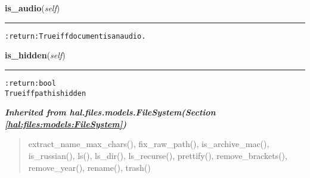     \label{hal:files:models:Document:is_audio}

    \vspace{0.5ex}

\hspace{.8\funcindent}\begin{boxedminipage}{\funcwidth}

    \raggedright \textbf{is\_audio}(\textit{self})

    \vspace{-1.5ex}

    \rule{\textwidth}{0.5\fboxrule}
\setlength{\parskip}{2ex}
\begin{alltt}

:return: True iff document is an audio.
\end{alltt}

\setlength{\parskip}{1ex}
    \end{boxedminipage}

    \label{hal:files:models:Document:is_hidden}

    \vspace{0.5ex}

\hspace{.8\funcindent}\begin{boxedminipage}{\funcwidth}

    \raggedright \textbf{is\_hidden}(\textit{self})

    \vspace{-1.5ex}

    \rule{\textwidth}{0.5\fboxrule}
\setlength{\parskip}{2ex}
\begin{alltt}

:return: bool
    True iff path is hidden
\end{alltt}

\setlength{\parskip}{1ex}
    \end{boxedminipage}


\large{\textbf{\textit{Inherited from hal.files.models.FileSystem\textit{(Section \ref{hal:files:models:FileSystem})}}}}

\begin{quote}
extract\_name\_max\_chars(), fix\_raw\_path(), is\_archive\_mac(), is\_russian(), ls(), ls\_dir(), ls\_recurse(), prettify(), remove\_brackets(), remove\_year(), rename(), trash()
\end{quote}

